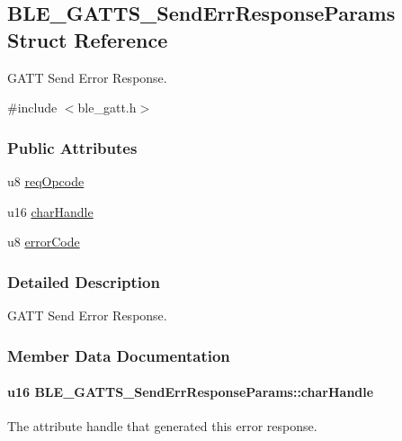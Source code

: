 \hypertarget{struct_b_l_e___g_a_t_t_s___send_err_response_params}{}\subsection{B\+L\+E\+\_\+\+G\+A\+T\+T\+S\+\_\+\+Send\+Err\+Response\+Params Struct Reference}
\label{struct_b_l_e___g_a_t_t_s___send_err_response_params}


G\+A\+TT Send Error Response.  




{\ttfamily \#include $<$ble\+\_\+gatt.\+h$>$}

\subsubsection*{Public Attributes}
\begin{DoxyCompactItemize}
\item 
u8 \hyperlink{struct_b_l_e___g_a_t_t_s___send_err_response_params_ac65e7133d29ce74d90d7f4ed0528078f}{req\+Opcode}
\item 
u16 \hyperlink{struct_b_l_e___g_a_t_t_s___send_err_response_params_add9aab4c09b2d8bb6d7957db12d1b3e3}{char\+Handle}
\item 
u8 \hyperlink{struct_b_l_e___g_a_t_t_s___send_err_response_params_a2ae3310941796f5fd1860541c8625f36}{error\+Code}
\end{DoxyCompactItemize}


\subsubsection{Detailed Description}
G\+A\+TT Send Error Response. 

\subsubsection{Member Data Documentation}
\paragraph[{\texorpdfstring{char\+Handle}{charHandle}}]{\setlength{\rightskip}{0pt plus 5cm}u16 B\+L\+E\+\_\+\+G\+A\+T\+T\+S\+\_\+\+Send\+Err\+Response\+Params\+::char\+Handle}\hypertarget{struct_b_l_e___g_a_t_t_s___send_err_response_params_add9aab4c09b2d8bb6d7957db12d1b3e3}{}\label{struct_b_l_e___g_a_t_t_s___send_err_response_params_add9aab4c09b2d8bb6d7957db12d1b3e3}
The attribute handle that generated this error response. 
